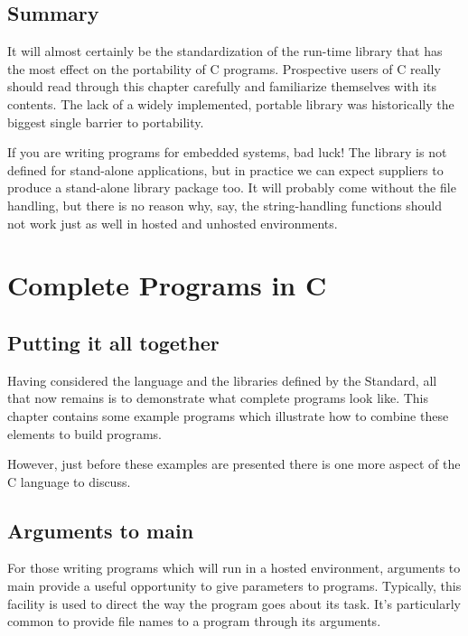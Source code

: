  
        \section{Summary}
        


  It will almost certainly be the standardization of the run-time library
   that has the most effect on the portability of C programs.  Prospective
   users of C really should read through this chapter carefully and
   familiarize themselves with its contents.  The lack of a widely implemented,
   portable library was historically the biggest single barrier to
   portability.


  If you are writing programs for embedded systems, bad luck!  The library
   is not defined for stand-alone applications, but in practice we can expect
   suppliers to produce a stand-alone library package too.  It will probably
   come without the file handling, but there is no reason why, say, the
   string-handling functions should not work just as well in hosted and
   unhosted environments.


 \chapter{Complete Programs in C}\label{chap:completeCprg}


        \section{Putting it all together}
        

  

  Having considered the language and the libraries defined by the
   Standard, all that now remains is to demonstrate what complete programs
   look like. This chapter contains some example programs which illustrate
   how to combine these elements to build programs.


  However, just before these examples are presented there is one more
   aspect of the C language to discuss.


 
        \section{Arguments to main}
        

  

  For those writing programs which will run in a hosted environment,
   arguments to main provide a useful opportunity to give parameters to
   programs. Typically, this facility is used to direct the way the program
   goes about its task. It's particularly common to provide file names to a
   program through its arguments.


